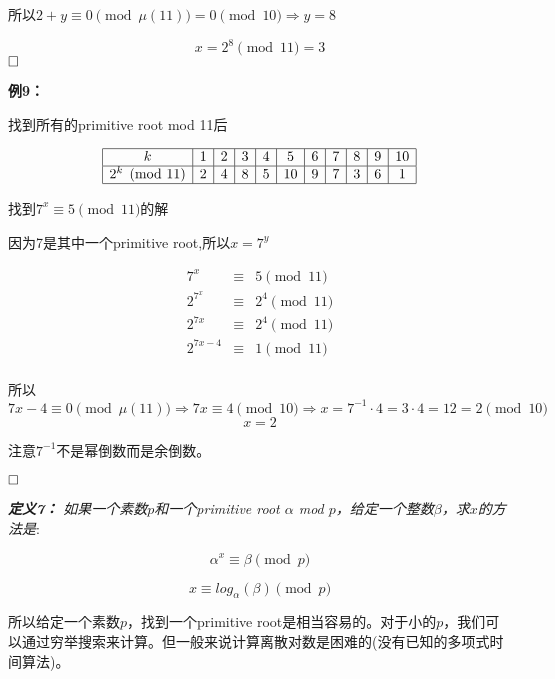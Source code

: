 \documentclass{article}
\begin{document}
所以$2+y \equiv 0 \pmod{\mu(11)} = 0 \pmod{10} \Rightarrow y = 8$    

$$x = 2^8 \pmod{11} = 3$$
$\hfill\square$ 


\textbf{例9：}


找到所有的primitive root mod 11后

$$
\begin{array}{|c|c|c|c|c|c|c|c|c|c|c|}
\hline 
k & 1&2 &3&4 &5 &6 &7 &8 &9&10 \\
\hline 
2^k \pmod{11} &2&4&8&5&10&9&7&3&6&1\\
\hline 
\end{array}
$$

找到$7^x \equiv 5 \pmod{11}$的解

因为7是其中一个primitive root,所以$x=7^y$

\begin{eqnarray}   
\label{eq}
7^x  &\equiv&5 \pmod{11} \nonumber \\
2^{7^x}  &\equiv&2^4 \pmod{11} \nonumber \\
2^{7x}  &\equiv&2^4 \pmod{11} \nonumber \\
2^{7x-4}  &\equiv&1 \pmod{11} \nonumber \\
\nonumber 
\end{eqnarray}

所以$7x-4 \equiv 0 \pmod{\mu(11)} \Rightarrow 7x\equiv 4 \pmod{10} \Rightarrow x = 7^{-1}\cdot 4 = 3 \cdot 4 = 12 = 2 \pmod{10}$    
$$x = 2$$

注意$ 7^{-1}$不是幂倒数而是余倒数。

$\hfill\square$ 

\textit{\textbf{定义7：} 如果一个素数$p$和一个primitive root $\alpha$ mod $p$，给定一个整数$\beta$，求$x$的方法是}:


$$\alpha^x  \equiv \beta \pmod{ p }$$

$$x  \equiv log_{\alpha}(\beta) \pmod{ p }$$

所以给定一个素数$p$，找到一个primitive root是相当容易的。对于小的$p$，我们可以通过穷举搜索来计算。但一般来说计算离散对数是困难的(没有已知的多项式时间算法)。
\end{document}
